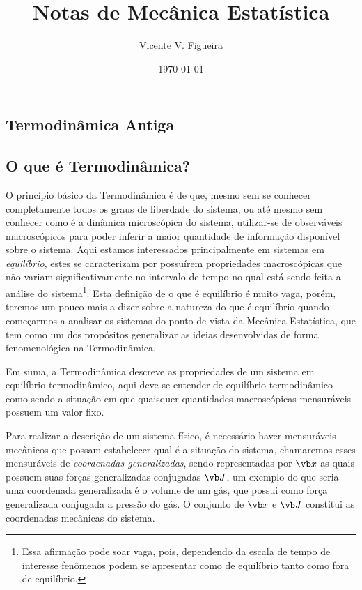 \documentclass[twoside,reqno]{amsart}
\title{
Notas de Mecânica Estatística
}
\author{
  Vicente V. Figueira
       }
\date{\today}
\numberwithin{equation}{section}
\begin{document}
\maketitle

\tableofcontents


\begin{refsection}
\section{Termodinâmica Antiga}

\subsection{O que é Termodinâmica?}

O princípio básico da Termodinâmica é de que, mesmo sem se conhecer completamente todos os graus de liberdade 
do sistema, ou até mesmo sem conhecer como é a dinâmica microscópica do sistema, utilizar-se de observáveis 
macroscópicos para poder inferir a maior quantidade de informação disponível sobre o sistema. Aqui estamos 
interessados principalmente em sistemas em \emph{equilíbrio}, estes se caracterizam por possuírem propriedades 
macroscópicas que não variam significativamente no intervalo de tempo no qual está sendo feita a análise do 
sistema\footnote{Essa afirmação pode soar vaga, pois, dependendo da escala de tempo de interesse fenômenos podem se apresentar como de equilíbrio tanto como fora de equilíbrio.}. Esta definição de o que é equilíbrio é muito vaga, porém, teremos um pouco mais a dizer sobre a natureza 
do que é equilíbrio quando começarmos a analisar os sistemas do ponto de vista da Mecânica Estatística, que 
tem como um dos propósitos generalizar as ideias desenvolvidas de forma fenomenológica na Termodinâmica. 

Em suma, a Termodinâmica descreve as propriedades de um sistema em equilíbrio termodinâmico, aqui deve-se 
entender de equilíbrio termodinâmico como sendo a situação em que quaisquer quantidades macroscópicas mensuráveis possuem um valor fixo.

Para realizar a descrição de um sistema físico, é necessário haver mensuráveis mecânicos que possam estabelecer qual é a situação do sistema, chamaremos esses mensuráveis de \emph{coordenadas generalizadas}, 
sendo representadas por $\vb x$ as quais possuem suas forças generalizadas conjugadas $\vb J$, um exemplo do 
que seria uma coordenada generalizada é o volume de um gás, que possui como força generalizada conjugada a 
pressão do gás. O conjunto de $\vb x$ e $\vb J$ constitui as coordenadas mecânicas do sistema.


\end{refsection}
\end{document}
